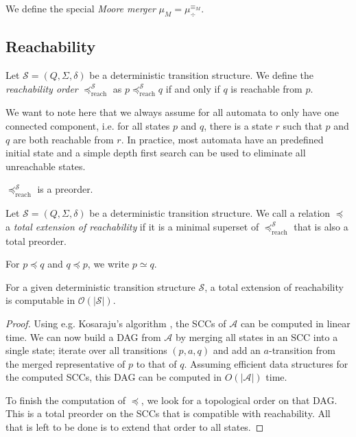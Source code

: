 \begin{defn}
	We define the special \emph{Moore merger} $\mu_M = \mu_\div^{\equiv_M}$.
\end{defn}

\vspace{5pt}





\subsection{Reachability}

\begin{defn}
	Let $\mathcal{S} = (Q, \Sigma, \delta)$ be a deterministic transition structure. We define the \emph{reachability order} $\preceq_\text{reach}^\mathcal{S}$ as $p \preceq_\text{reach}^\mathcal{S} q$ if and only if $q$ is reachable from $p$. 
\end{defn}

We want to note here that we always assume for all automata to only have one connected component, i.e. for all states $p$ and $q$, there is a state $r$ such that $p$ and $q$ are both reachable from $r$. In practice, most automata have an predefined initial state and a simple depth first search can be used to eliminate all unreachable states.

\begin{lem}
	$\preceq_\text{reach}^\mathcal{S}$ is a preorder.
\end{lem}

\begin{defn}
	Let $\mathcal{S} = (Q, \Sigma, \delta)$ be a deterministic transition structure. We call a relation $\preceq$ a \emph{total extension of reachability} if it is a minimal superset of $\preceq_\text{reach}^\mathcal{S}$ that is also a total preorder.
	
	For $p \preceq q$ and $q \preceq p$, we write $p \simeq q$.
\end{defn}

\begin{lem}
	For a given deterministic transition structure $\mathcal{S}$, a total extension of reachability is computable in $\mathcal{O}(|\mathcal{S}|)$.
	\label{lem:general:reach_topo_lintime}
\end{lem}

\begin{proof}
	Using e.g. Kosaraju's algorithm \cite{Sharir81}, the SCCs of $\mathcal{A}$ can be computed in linear time. We can now build a DAG from $\mathcal{A}$ by merging all states in an SCC into a single state; iterate over all transitions $(p, a, q)$ and add an $a$-transition from the merged representative of $p$ to that of $q$. Assuming efficient data structures for the computed SCCs, this DAG can be computed in $O(|\mathcal{A}|)$ time.
	
	To finish the computation of $\preceq$, we look for a topological order on that DAG. This is a total preorder on the SCCs that is compatible with reachability. All that is left to be done is to extend that order to all states.
\end{proof}




